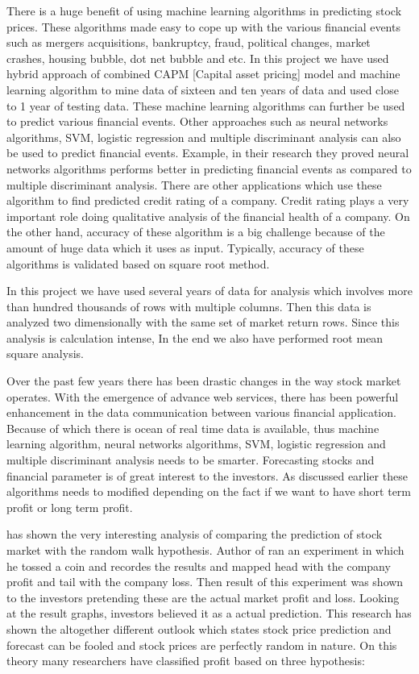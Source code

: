 \indent
There is a huge benefit of using machine learning algorithms in predicting stock prices. These algorithms made easy to cope up with the various financial events
such as mergers acquisitions, bankruptcy, fraud, political changes, market crashes, housing bubble, dot net bubble and etc. 
In this project we have used hybrid approach of combined CAPM [Capital asset pricing] model and machine learning algorithm to mine data of sixteen
and ten years of data and used close to 1 year of testing data. These machine learning algorithms can further be used to predict various financial events. 
Other approaches such as neural networks algorithms, SVM, logistic regression and multiple discriminant analysis can also be used to predict financial events. 
Example, \cite{Ref12} in their research they proved neural networks algorithms performs better in predicting financial events as compared to multiple discriminant 
analysis. There are other applications which use these algorithm to find predicted credit rating of a company. Credit rating plays a very important role 
doing qualitative analysis of the financial health of a company. On the other hand, accuracy of these algorithm is a big challenge because of the amount of huge data 
which it uses as input. Typically, accuracy of these algorithms is validated based on square root method. 

\indent
In this project we have used several years of data for analysis which involves more than hundred thousands of rows with multiple columns. Then this data is 
analyzed two dimensionally with the same set of market return rows. Since this analysis is calculation intense, In the end we also have performed root mean
square analysis. 

\indent
Over the past few years there has been drastic changes in the way stock market operates. With the emergence of advance web services, there has been powerful 
enhancement in the data communication between various financial application. Because of which there is ocean of real time data is available, thus machine learning 
algorithm, neural networks algorithms, SVM, logistic regression and multiple discriminant analysis needs to be smarter. Forecasting stocks and financial parameter 
is of great interest to the investors. As discussed earlier these algorithms needs to modified depending on the fact if we want to have short term profit or long 
term profit. 

\indent 
\cite{Ref13} has shown the very interesting analysis of comparing the prediction of stock market with the random walk hypothesis. Author of \cite{Ref13} ran an 
experiment in which he tossed a coin and recordes the results and mapped head with the company profit and tail with the company loss. Then result of this experiment 
was shown to the investors pretending these are the actual market profit and loss. Looking at the result graphs, investors believed it as a actual prediction. 
This research has shown the altogether different outlook which states stock price prediction and forecast can be fooled and stock prices are perfectly random in
nature. On this theory many researchers have classified profit based on three hypothesis:

